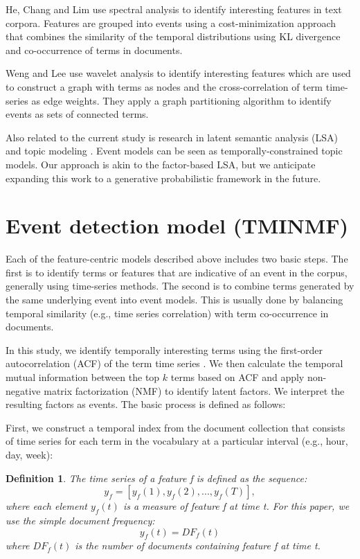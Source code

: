\documentclass{sig-alternate}
\newtheorem{definition}{Definition}
\begin{document}
He, Chang and Lim \cite{He2007} use spectral analysis to identify interesting features in text corpora. Features are grouped into events using a cost-minimization approach that combines the similarity of the temporal distributions using KL divergence and co-occurrence of terms in documents. 

Weng and Lee \cite{Weng2011} use wavelet analysis to identify interesting features which are used to construct a graph with terms as nodes and the cross-correlation of term time-series as edge weights. They apply a graph partitioning algorithm to identify events as sets of connected terms. 

Also related to the current study is research in latent semantic analysis (LSA) \cite{Deerwester1990, Hofmann1999} and topic modeling \cite{Blei2003}.  Event models can be seen as temporally-constrained topic models. Our approach is akin to the factor-based LSA, but we anticipate expanding this work to a generative probabilistic framework in the future.  




\section{Event detection model (TMINMF)}	

Each of the feature-centric models described above includes two basic steps. The first is to identify terms or features that are indicative of an event in the corpus, generally using time-series methods. The second is to combine terms generated by the same underlying event into event models.  This is usually done by balancing temporal similarity (e.g., time series correlation) with term co-occurrence in documents.

In this study, we identify temporally interesting terms using the first-order autocorrelation (ACF) of the term time series \cite{Jones2007}. We then calculate the temporal mutual information between the top $k$ terms based on ACF and apply non-negative matrix factorization (NMF) to identify latent factors. We interpret the resulting factors as events. The basic process is defined as follows:

First, we construct a temporal index from the document collection that consists of time series for each term in the vocabulary at a particular interval (e.g., hour, day, week):
\begin{definition}
 The time series of a feature f is defined as the sequence:
\[
y_f = [y_f(1), y_f(2), ..., y_f(T)],
\]
where each element $y_f(t)$ is a measure of feature f at time t. For this paper, we use the simple document frequency:
\[
	y_f(t) = DF_f(t)
\]
where $DF_f(t)$ is the number of documents containing feature f at time t.
\end{definition}
\end{document}
